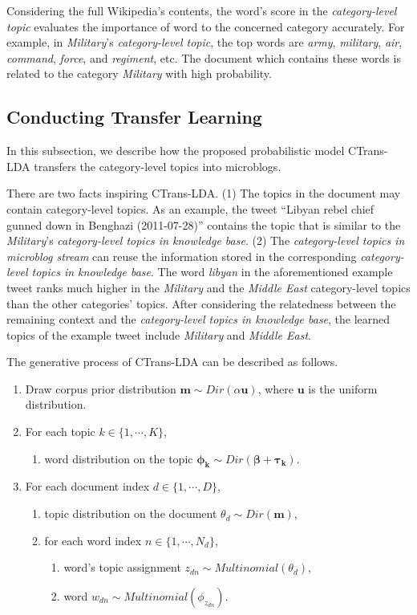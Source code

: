 \documentclass[runningheads,a4paper]{llncs}
\theoremstyle{exampstyle}
\begin{document}
Considering the full Wikipedia's contents, the word's score in the \textit{category-level topic} evaluates the importance of word to the concerned category accurately. 
For example, in \textit{Military}'s \textit{category-level topic}, the top  words are \textit{army}, \textit{military}, \textit{air}, \textit{command}, \textit{force}, and \textit{regiment}, etc. 
The document which contains these words is related to the category \textit{Military} with high probability. 

\subsection{Conducting Transfer Learning}
\label{subsec:rs_initialization}
In this subsection, we describe how the proposed probabilistic model CTrans-LDA transfers the category-level topics into microblogs.

There are two facts inspiring CTrans-LDA. 
(1) The topics in the document may contain category-level topics. 
As an example, the tweet ``Libyan rebel chief gunned down in Benghazi (2011-07-28)'' contains the topic that is similar to the \textit{Military}'s \textit{category-level topics in knowledge base}.
(2) The \textit{category-level topics in microblog stream} can reuse the information stored in the corresponding \textit{category-level topics in knowledge base}.
The word \textit{libyan} in the aforementioned example tweet ranks much higher in the \textit{Military} and the \textit{Middle East} category-level topics than the other categories' topics.
After considering the relatedness between the remaining context and the \textit{category-level topics in knowledge base}, the learned topics of the example tweet include \textit{Military} and \textit{Middle East}. 

The generative process of CTrans-LDA can be described as follows.
\begin{enumerate}[topsep=0pt,itemsep=0mm]
\item Draw corpus prior distribution \(\bm{m} \sim Dir(\alpha \bm{u})\), where \(\bm{u}\) is the uniform distribution.
\item For each topic \(k \in \{1,\cdots,K\}\), 
\begin{enumerate}[itemsep=0mm]
\item word distribution on the topic \(\bm{\phi_k} \sim Dir(\bm{\beta}+ \bm{\tau_k})\).
\end{enumerate}
\item For each document index \(d \in \{1,\cdots,D\}\),
\begin{enumerate}[itemsep=0mm]
\item topic distribution on the document \(\theta_d \sim Dir(\bm{m})\),
\item for each word index \(n \in \{1,\cdots,N_d\}\),
\begin{enumerate}[itemsep=0mm]
\item word's topic assignment \(z_{dn} \sim Multinomial(\theta_d)\), 
\item word \(w_{dn} \sim Multinomial(\phi_{z_{dn}})\). 
\end{enumerate}
\end{enumerate}

\end{enumerate}
\end{document}
